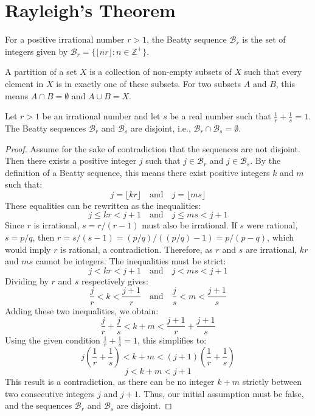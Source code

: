 \chapter{Rayleigh's Theorem}

\begin{definition}
For a positive irrational number $r > 1$, the Beatty sequence $\mathcal{B}_r$ is the set of integers given by $\mathcal{B}_r = \{ \lfloor nr \rfloor : n \in \mathbb{Z}^+ \}$.
\end{definition}

\begin{definition}
A partition of a set $X$ is a collection of non-empty subsets of $X$ such that every element in $X$ is in exactly one of these subsets. For two subsets $A$ and $B$, this means $A \cap B = \emptyset$ and $A \cup B = X$.
\end{definition}

\begin{lemma}
Let $r > 1$ be an irrational number and let $s$ be a real number such that $\frac{1}{r} + \frac{1}{s} = 1$. The Beatty sequences $\mathcal{B}_r$ and $\mathcal{B}_s$ are disjoint, i.e., $\mathcal{B}_r \cap \mathcal{B}_s = \emptyset$.
\end{lemma}

\begin{proof}
Assume for the sake of contradiction that the sequences are not disjoint. Then there exists a positive integer $j$ such that $j \in \mathcal{B}_r$ and $j \in \mathcal{B}_s$.
By the definition of a Beatty sequence, this means there exist positive integers $k$ and $m$ such that:
$$j = \lfloor kr \rfloor \quad \text{and} \quad j = \lfloor ms \rfloor$$
These equalities can be rewritten as the inequalities:
$$j \leq kr < j+1 \quad \text{and} \quad j \leq ms < j+1$$
Since $r$ is irrational, $s = r/(r-1)$ must also be irrational. If $s$ were rational, $s = p/q$, then $r = s/(s-1) = (p/q)/((p/q)-1) = p/(p-q)$, which would imply $r$ is rational, a contradiction. Therefore, as $r$ and $s$ are irrational, $kr$ and $ms$ cannot be integers. The inequalities must be strict:
$$j < kr < j+1 \quad \text{and} \quad j < ms < j+1$$
Dividing by $r$ and $s$ respectively gives:
$$\frac{j}{r} < k < \frac{j+1}{r} \quad \text{and} \quad \frac{j}{s} < m < \frac{j+1}{s}$$
Adding these two inequalities, we obtain:
$$\frac{j}{r} + \frac{j}{s} < k+m < \frac{j+1}{r} + \frac{j+1}{s}$$
Using the given condition $\frac{1}{r} + \frac{1}{s} = 1$, this simplifies to:
$$j\left(\frac{1}{r} + \frac{1}{s}\right) < k+m < (j+1)\left(\frac{1}{r} + \frac{1}{s}\right)$$
$$j < k+m < j+1$$
This result is a contradiction, as there can be no integer $k+m$ strictly between two consecutive integers $j$ and $j+1$. Thus, our initial assumption must be false, and the sequences $\mathcal{B}_r$ and $\mathcal{B}_s$ are disjoint.
\end{proof}

